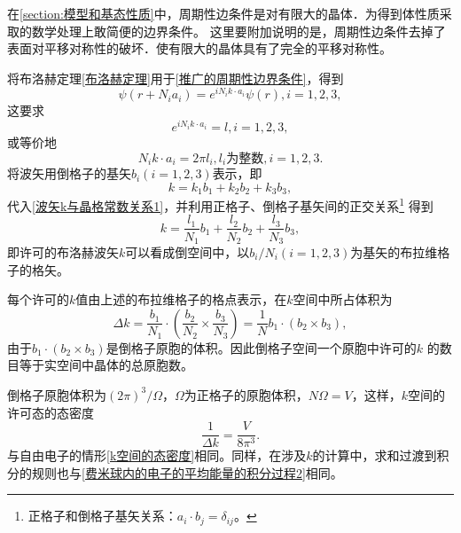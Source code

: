             在\autoref{section:模型和基态性质}中，周期性边条件是对有限大的晶体．为得到体性质采取的数学处理上敢简便的边界条件。
            这里要附加说明的是，周期性边条件去掉了表面对平移对称性的破坏．使有限大的晶体具有了完全的平移对称性。

            将布洛赫定理\autoref{布洛赫定理}用于\autoref{推广的周期性边界条件}，得到
            \begin{equation}
                \psi(r+N_ia_i)=e^{iN_ik\cdot a_i}\psi(r),i=1,2,3,
            \end{equation}
            这要求
            \begin{equation}
                e^{iN_ik\cdot a_i}=l,i=1,2,3,
            \end{equation}
            或等价地
            \begin{equation}
                N_ik\cdot a_i=2\pi l_i,l_i\text{为整数},i=1,2,3\label{波矢k与晶格常数关系1}.
            \end{equation}
            将波矢用倒格子的基矢$b_i(i=1,2,3)$表示，即
            \begin{equation}
                k=k_1b_1+k_2b_2+k_3b_3,
            \end{equation}
            代入\autoref{波矢k与晶格常数关系1}，并利用正格子、倒格子基矢间的正交关系\footnote{正格子和倒格子基矢关系：$a_i\cdot b_j=\delta_{ij}$。}
            得到
            \begin{equation}
                k=\frac{l_1}{N_1}b_1+\frac{l_2}{N_2}b_2+\frac{l_3}{N_3}b_3,
            \end{equation}
            即许可的布洛赫波矢$k$可以看成倒空间中，以$b_i/N_i(i=1,2,3)$为基矢的布拉维格子的格矢。

            每个许可的$k$值由上述的布拉维格子的格点表示，在$k$空间中所占体积为
            \begin{equation}
                \Delta k=\frac{b_1}{N_1}\cdot\left(\frac{b_2}{N_2}\times\frac{b_3}{N_3}\right)=\frac{1}{N}b_1\cdot\left(b_2\times b_3\right),
            \end{equation}
            由于$b_1\cdot\left(b_2\times b_3\right)$是倒格子原胞的体积。因此倒格子空间一个原胞中许可的$k$
            的数目等于实空间中晶体的总原胞数。

            倒格子原胞体积为$\left(2\pi\right)^3/\Omega$，$\Omega$为正格子的原胞体积，$N\Omega=V$，这样，$k$空间的许可态的态密度
            \begin{equation}
                \frac{1}{\Delta k}=\frac{V}{8\pi^3}\label{周期性边界条件下的k空间态密度}.
            \end{equation}
            与自由电子的情形\autoref{k空间的态密度}相同。同样，在涉及$k$的计算中，求和过渡到积分的规则也与\autoref{费米球内的电子的平均能量的积分过程2}相同。

